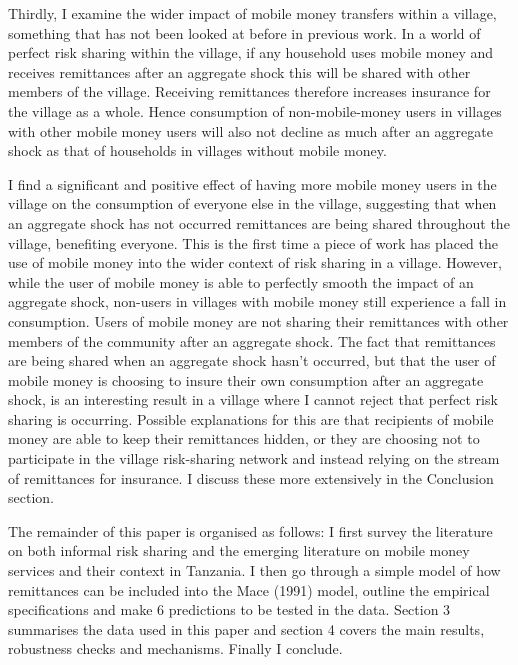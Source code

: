 Thirdly, I  examine the wider impact of mobile money transfers within a village, something that has not been looked at before in previous work. In a world of perfect risk sharing within the village, if any household  uses mobile money and receives remittances after an aggregate shock this will be shared with other members of the village.  Receiving remittances therefore increases  insurance for the village as a whole. Hence consumption of non-mobile-money users in villages with other mobile money users will also not decline as much after an aggregate shock as that of households in villages without mobile money.

I find a significant and positive effect of having more mobile money users in the village on the consumption of everyone else in the village, suggesting that when an aggregate shock has not occurred remittances are being shared throughout the village, benefiting everyone. This is the first time a piece of work has placed the use of mobile money into the wider context of risk sharing in a village. However, while the user of mobile money is able to perfectly smooth the impact of an aggregate shock, non-users in villages with mobile money still experience a fall in consumption. Users of mobile money are not sharing their remittances with other members of the community after an aggregate shock. The fact that remittances are being shared when an aggregate shock hasn't occurred, but that the user of mobile money is choosing to insure their own consumption after an aggregate shock, is an interesting result in a village where I cannot reject that perfect risk sharing is occurring. Possible explanations for this are that recipients of mobile money are able to keep their remittances hidden, or they are choosing not to participate in the village risk-sharing network and instead relying on the stream of remittances for insurance. I discuss these more extensively in the Conclusion section. 

The remainder of this paper is organised as follows: I first survey the literature on both informal risk sharing and the emerging literature on mobile money services and their context in Tanzania. I then go through a simple model of how remittances can be included into the Mace (1991) model, outline the empirical specifications and make 6 predictions to be tested in the data. Section 3 summarises the data used in this paper and section 4 covers the  main results, robustness checks and mechanisms. Finally I conclude.  
